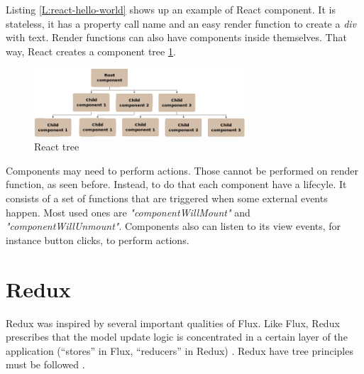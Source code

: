 \begin{codefigure}
\end{codefigure}

Listing \ref{L:react-hello-world} shows up an example of React component. It is
stateless, it has a property call name and an easy render function to create a
\textit{div} with text. Render functions can also have components inside
themselves. That way, React creates a component tree \ref{F:react-tree}.

\begin{figure}[htb]
	\begin{center}
		\includegraphics[width=0.7\textwidth]{./figures/react-tree.png}
		\caption{React tree}
		\label{F:react-tree}
	\end{center}
\end{figure}

Components may need to perform actions. Those cannot be performed on render 
function, as seen before. Instead, to do that each component have a lifecyle.
It consists of a set of functions that are triggered when some external events
happen. Most used ones are \textit{"componentWillMount"} and 
\textit{"componentWillUnmount"}. Components also can listen to its view
events, for instance button clicks, to perform actions.

\section{Redux}

Redux was inspired by several important qualities of Flux. Like Flux, Redux
prescribes that the model update logic is concentrated in a certain layer of
the application (“stores” in Flux, “reducers” in Redux) \cite{redux-prior-art}.
Redux have tree principles must be followed \cite{redux-principles}.

